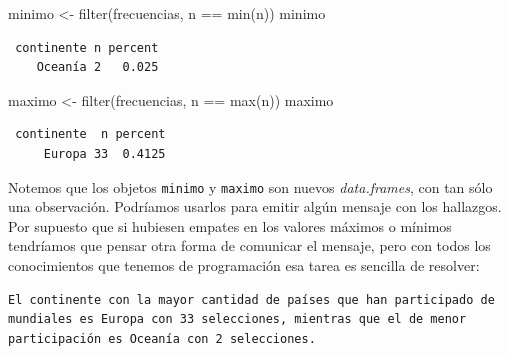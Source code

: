 \documentclass[
]{book}
\newenvironment{Shaded}{\begin{snugshade}}{\end{snugshade}}
\newcommand{\FunctionTok}[1]{\textcolor[rgb]{0.00,0.00,0.00}{#1}}
\newcommand{\NormalTok}[1]{#1}
\newcommand{\OtherTok}[1]{\textcolor[rgb]{0.56,0.35,0.01}{#1}}
\newcommand{\SpecialCharTok}[1]{\textcolor[rgb]{0.00,0.00,0.00}{#1}}
\newcommand{\StringTok}[1]{\textcolor[rgb]{0.31,0.60,0.02}{#1}}
\begin{document}
\begin{Shaded}
\begin{Highlighting}[]
\NormalTok{minimo }\OtherTok{\textless{}{-}} \FunctionTok{filter}\NormalTok{(frecuencias, n }\SpecialCharTok{==} \FunctionTok{min}\NormalTok{(n))}
\NormalTok{minimo}
\end{Highlighting}
\end{Shaded}

\begin{verbatim}
 continente n percent
    Oceanía 2   0.025
\end{verbatim}

\begin{Shaded}
\begin{Highlighting}[]
\NormalTok{maximo }\OtherTok{\textless{}{-}} \FunctionTok{filter}\NormalTok{(frecuencias, n }\SpecialCharTok{==} \FunctionTok{max}\NormalTok{(n))}
\NormalTok{maximo}
\end{Highlighting}
\end{Shaded}

\begin{verbatim}
 continente  n percent
     Europa 33  0.4125
\end{verbatim}

Notemos que los objetos \texttt{minimo} y \texttt{maximo} son nuevos \emph{data.frames}, con tan sólo una observación. Podríamos usarlos para emitir algún mensaje con los hallazgos. Por supuesto que si hubiesen empates en los valores máximos o mínimos tendríamos que pensar otra forma de comunicar el mensaje, pero con todos los conocimientos que tenemos de programación esa tarea es sencilla de resolver:

\begin{Shaded}
\end{Shaded}

\begin{verbatim}
El continente con la mayor cantidad de países que han participado de mundiales es Europa con 33 selecciones, mientras que el de menor participación es Oceanía con 2 selecciones.
\end{verbatim}
\end{document}
